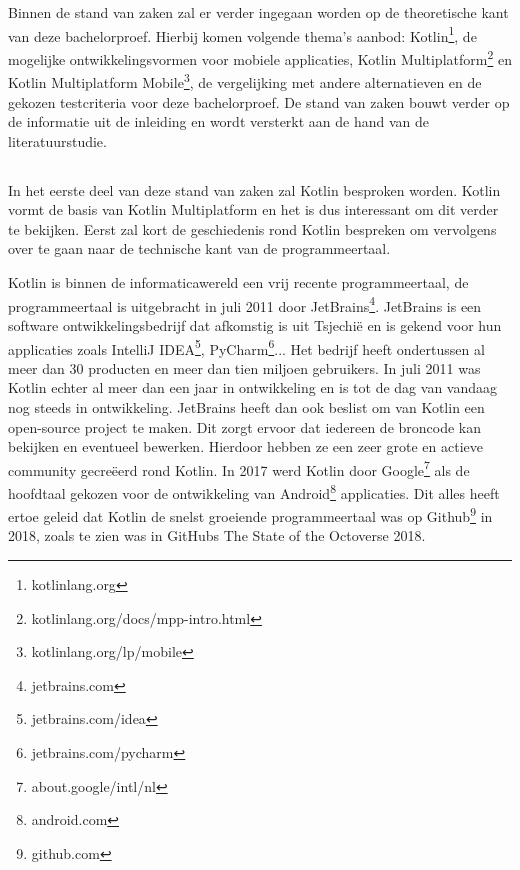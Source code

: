 \chapter{}
\label{ch:stand-van-zaken}

Binnen de stand van zaken zal er verder ingegaan worden op de theoretische kant van deze bachelorproef. Hierbij komen volgende thema's aanbod: Kotlin\footnote{kotlinlang.org}, de mogelijke ontwikkelingsvormen voor mobiele applicaties, Kotlin Multiplatform\footnote{kotlinlang.org/docs/mpp-intro.html} en Kotlin Multiplatform Mobile\footnote{kotlinlang.org/lp/mobile}, de vergelijking met andere alternatieven en de gekozen testcriteria voor deze bachelorproef. De stand van zaken bouwt verder op de informatie uit de inleiding en wordt versterkt aan de hand van de literatuurstudie. 


\section{}
\label{sec:SVZkotlin}

In het eerste deel van deze stand van zaken zal Kotlin besproken worden. Kotlin vormt de basis van Kotlin Multiplatform en het is dus interessant om dit verder te bekijken. Eerst zal kort de geschiedenis rond Kotlin bespreken om vervolgens over te gaan naar de technische kant van de programmeertaal.

Kotlin is binnen de informaticawereld een vrij recente programmeertaal, de programmeertaal is uitgebracht in juli 2011 door JetBrains\footnote{jetbrains.com}.\autocite{Jemerov2011} JetBrains is een software ontwikkelingsbedrijf dat afkomstig is uit Tsjechië en is gekend voor hun applicaties zoals IntelliJ IDEA\footnote{jetbrains.com/idea}, PyCharm\footnote{jetbrains.com/pycharm}... Het bedrijf heeft ondertussen al meer dan 30 producten en meer dan tien miljoen gebruikers.\autocite{JetBrains2021} In juli 2011 was Kotlin echter al meer dan een jaar in ontwikkeling en is tot de dag van vandaag nog steeds in ontwikkeling. JetBrains heeft dan ook beslist om van Kotlin een open-source project te maken. Dit zorgt ervoor dat iedereen de broncode kan bekijken en eventueel bewerken. Hierdoor hebben ze een zeer grote en actieve community gecreëerd rond Kotlin. In 2017 werd Kotlin door Google\footnote{about.google/intl/nl} als de hoofdtaal gekozen voor de ontwikkeling van Android\footnote{android.com} applicaties.\autocite{Shafirov2017} Dit alles heeft ertoe geleid dat Kotlin de snelst groeiende programmeertaal was op Github\footnote{github.com} in 2018, zoals te zien was in GitHubs The State of the Octoverse 2018.\autocite{GitHub2018} 


